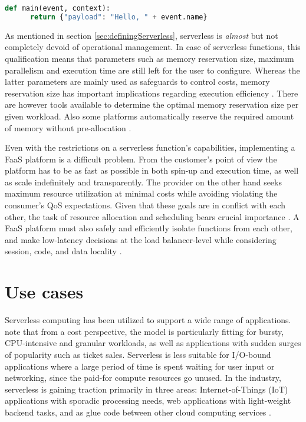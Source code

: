 
\renewcommand\thelstlisting{\arabic{lstlisting}}
\setcounter{lstlisting}{0}
\begin{lstlisting}[language=Python,caption=Example FaaS handler,captionpos=b,label=lst:handlerExample,showstringspaces=false,belowskip=2em,frame=tb,aboveskip=2em]
  def main(event, context):
      return {"payload": "Hello, " + event.name}
\end{lstlisting}

As mentioned in section \ref{sec:definingServerless}, serverless is \textit{almost} but not completely devoid of operational management. In case of serverless functions, this qualification means that parameters such as memory reservation size, maximum parallelism and execution time are still left for the user to configure. Whereas the latter parameters are mainly used as safeguards to control costs, memory reservation size has important implications regarding execution efficiency \parencite{lloydserverless}. There are however tools available to determine the optimal memory reservation size per given workload. Also some platforms automatically reserve the required amount of memory without pre-allocation \parencite{microsoft18azureFunctions}.

Even with the restrictions on a serverless function's capabilities, implementing a FaaS platform is a difficult problem. From the customer's point of view the platform has to be as fast as possible in both spin-up and execution time, as well as scale indefinitely and transparently. The provider on the other hand seeks maximum resource utilization at minimal costs while avoiding violating the consumer's QoS expectations. Given that these goals are in conflict with each other, the task of resource allocation and scheduling bears crucial importance \parencite{reza17controller}. A FaaS platform must also safely and efficiently isolate functions from each other, and make low-latency decisions at the load balancer-level while considering session, code, and data locality \parencite{hendrickson16openlambda}.

\section{Use cases} \label{sec:useCases}

Serverless computing has been utilized to support a wide range of applications. \textcite{baldini17currentTrends} note that from a cost perspective, the model is particularly fitting for bursty, CPU-intensive and granular workloads, as well as applications with sudden surges of popularity such as ticket sales. Serverless is less suitable for I/O-bound applications where a large period of time is spent waiting for user input or networking, since the paid-for compute resources go unused. In the industry, serverless is gaining traction primarily in three areas: Internet-of-Things (IoT) applications with sporadic processing needs, web applications with light-weight backend tasks, and as glue code between other cloud computing services \parencite{spillner18faaster}.

